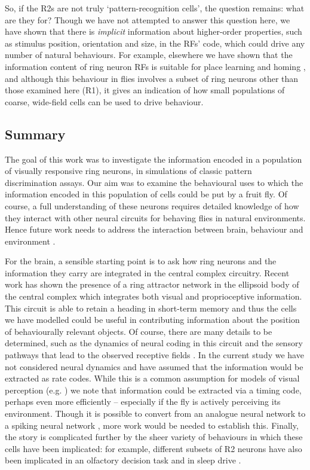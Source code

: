 So, if the R2s are not truly `pattern-recognition cells', the question remains: what are they for?
Though we have not attempted to answer this question here, we have shown that there is \emph{implicit} information about higher-order properties, such as stimulus position, orientation and size, in the RFs' code, which could drive any number of natural behaviours.
For example, elsewhere we have shown that the information content of ring neuron RFs is suitable for place learning and homing \cite{Dewar2015}, and although this behaviour in flies involves a subset of ring neurons other than those examined here (R1), it gives an indication of how small populations of coarse, wide-field cells can be used to drive behaviour.

\subsection*{Summary}
The goal of this work was to investigate the information encoded in a population of visually responsive ring neurons, in simulations of classic pattern discrimination assays.
Our aim was to examine the behavioural uses to which the information encoded in this population of cells could be put by a fruit fly.
Of course, a full understanding of these neurons requires detailed knowledge of how they interact with other neural circuits for behaving flies in natural environments.
Hence future work needs to address the interaction between brain, behaviour and environment \cite{Chiel1997}.

For the brain, a sensible starting point is to ask how ring neurons and the information they carry are integrated in the central complex circuitry.
Recent work has shown the presence of a ring attractor network \cite{Seelig2015,Cope2017,Green2017,Turner-Evans2017} in the ellipsoid body of the central complex which integrates both visual and proprioceptive information.
This circuit is able to retain a heading in short-term memory \cite{Neuser2008} and thus the cells we have modelled could be useful in contributing information about the position of behaviourally relevant objects.
Of course, there are many details to be determined, such as the dynamics of neural coding in this circuit and the sensory pathways that lead to the observed receptive fields \cite{Sun2017}.
In the current study we have not considered neural dynamics and have assumed that the information would be extracted as rate codes.
While this is a common assumption for models of visual perception (e.g. \cite{Hubel1962}) we note that information could be extracted via a timing code, perhaps even more efficiently -- especially if the fly is actively perceiving its environment.
Though it is possible to convert from an analogue neural network to a spiking neural network \cite{Diehl2015}, more work would be needed to establish this.
Finally, the story is complicated further by the sheer variety of behaviours in which these cells have been implicated:
for example, different subsets of R2 neurons have also been implicated in an olfactory decision task \cite{Azanchi2013} and in sleep drive \cite{Liu2016}.

